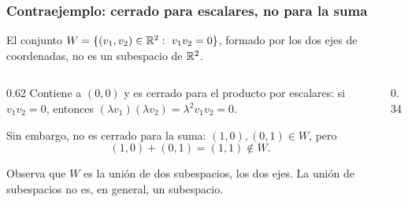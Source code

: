 \begin{frame}
    \frametitle{Contraejemplo: cerrado para escalares, no para la suma}

    \begin{example}
        El conjunto $W=\{(v_1,v_2)\in\R^2:\ v_1v_2=0\}$, formado por los dos
        ejes de coordenadas, \alert{no} es un subespacio de $\mathbb{R}^2$.
    \end{example}

    \begin{columns}[T]
        \begin{column}{0.62\textwidth}
            Contiene a $(0,0)$ y es cerrado para el producto por escalares:
            si $v_1v_2=0$, entonces $(\lambda v_1)(\lambda v_2)=\lambda^2v_1v_2=0$.

            \medskip

            Sin embargo, no es cerrado para la suma: $(1,0),(0,1)\in W$, pero
            \[
                (1,0)+(0,1)=(1,1)\notin W.
            \]

            Observa que $W$ es la \alert{unión} de dos subespacios, los dos ejes.
            La unión de subespacios no es, en general, un subespacio.
        \end{column}
        \begin{column}{0.34\textwidth}
            \centering
        \end{column}
    \end{columns}
\end{frame}

